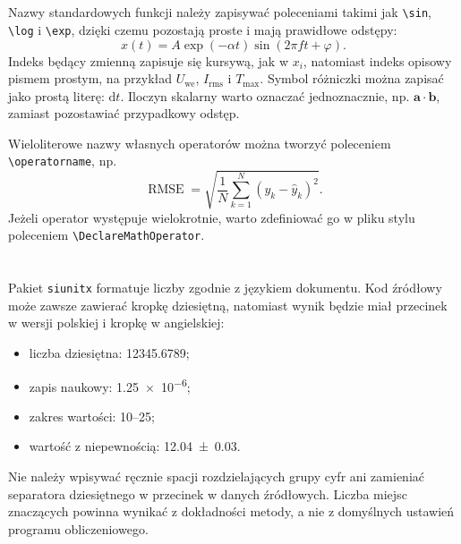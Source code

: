 \section{}

Nazwy standardowych funkcji należy zapisywać poleceniami takimi jak \verb|\sin|,
\verb|\log| i \verb|\exp|, dzięki czemu pozostają proste i mają prawidłowe odstępy:
\begin{equation}
  x(t)=A\exp(-\alpha t)\sin(2\pi f t+\varphi).
  \label{eq:sygnal-tlumiony}
\end{equation}
Indeks będący zmienną zapisuje się kursywą, jak w $x_i$, natomiast indeks opisowy
pismem prostym, na przykład $U_{\mathrm{we}}$, $I_{\mathrm{rms}}$ i $T_{\max}$.
Symbol różniczki można zapisać jako prostą literę: $\mathrm{d}t$. Iloczyn skalarny
warto oznaczać jednoznacznie, np. $\boldsymbol{a}\cdot\boldsymbol{b}$, zamiast
pozostawiać przypadkowy odstęp.

Wieloliterowe nazwy własnych operatorów można tworzyć poleceniem
\verb|\operatorname|, np.
\begin{equation}
  \operatorname{RMSE}
    = \sqrt{\frac{1}{N}\sum_{k=1}^{N}(y_k-\hat{y}_k)^2}.
  \label{eq:rmse}
\end{equation}
Jeżeli operator występuje wielokrotnie, warto zdefiniować go w pliku stylu poleceniem
\verb|\DeclareMathOperator|.

\section{}

Pakiet \texttt{siunitx} formatuje liczby zgodnie z językiem dokumentu. Kod źródłowy
może zawsze zawierać kropkę dziesiętną, natomiast wynik będzie miał przecinek w wersji
polskiej i kropkę w angielskiej:
\begin{itemize}
  \item liczba dziesiętna: \num{12345.6789};
  \item zapis naukowy: \num{1.25e-6};
  \item zakres wartości: \numrange{10}{25};
  \item wartość z niepewnością: \num{12.04(3)}.
\end{itemize}

Nie należy wpisywać ręcznie spacji rozdzielających grupy cyfr ani zamieniać separatora
dziesiętnego w przecinek w danych źródłowych. Liczba miejsc znaczących powinna wynikać
z dokładności metody, a nie z domyślnych ustawień programu obliczeniowego.

